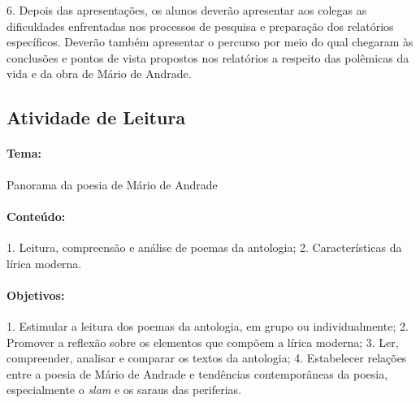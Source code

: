 \documentclass[11pt]{extarticle}
\begin{document}
6. Depois das apresentações, os alunos deverão apresentar aos colegas as
dificuldades enfrentadas nos processos de pesquisa e preparação dos
relatórios específicos. Deverão também apresentar o percurso por meio do
qual chegaram às conclusões e pontos de vista propostos nos relatórios a
respeito das polêmicas da vida e da obra de Mário de Andrade.


\subsection{Atividade de Leitura}





\paragraph{Tema:} Panorama da poesia de Mário de Andrade

\paragraph{Conteúdo:} 1. Leitura, compreensão e análise de poemas da
antologia; 2. Características da lírica moderna.

\paragraph{Objetivos:} 1. Estimular a leitura dos poemas da antologia, em
grupo ou individualmente; 2. Promover a reflexão sobre os elementos que
compõem a lírica moderna; 3. Ler, compreender, analisar e comparar os
textos da antologia; 4. Estabelecer relações entre a poesia de Mário de
Andrade e tendências contemporâneas da poesia, especialmente o
\emph{slam} e os saraus das periferias.
\end{document}
